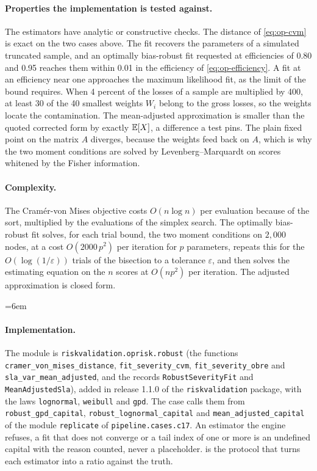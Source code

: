 \paragraph{Properties the implementation is tested against.} The estimators have analytic or constructive checks. The distance of \cref{eq:op-cvm} is exact on the two
cases above. The fit recovers the parameters of a simulated truncated sample, and an optimally bias-robust fit requested at efficiencies of 0.80 and 0.95 reaches them within
0.01 in the efficiency of \cref{eq:op-efficiency}. A fit at an efficiency near one approaches the maximum likelihood fit, as the limit of the bound requires. When 4 percent of the
losses of a sample are multiplied by 400, at least 30 of the 40 smallest weights $W_i$ belong to the gross losses, so the weights locate the contamination. The mean-adjusted
approximation is smaller than the quoted corrected form by exactly $\mathbb{E}[X]$, a difference a test pins. The plain fixed point on the matrix $A$ diverges, because the weights feed back on $A$,
which is why the two moment conditions are solved by Levenberg--Marquardt on scores whitened by the Fisher information.

\paragraph{Complexity.} The Cram\'er-von Mises objective costs $O(n\log n)$ per evaluation because of the sort, multiplied by the evaluations of the simplex search. The optimally
bias-robust fit solves, for each trial bound, the two moment conditions on $2{,}000$ nodes, at a cost $O(2000\,p^2)$ per iteration for $p$ parameters, repeats this for the
$O(\log(1/\varepsilon))$ trials of the bisection to a tolerance $\varepsilon$, and then solves the estimating equation on the $n$ scores at $O(np^2)$ per iteration.
The adjusted approximation is closed form.

\begingroup\emergencystretch=6em
\paragraph{Implementation.} The module is \texttt{riskvalidation.\allowbreak oprisk.\allowbreak robust} (the functions \texttt{cramer\_\allowbreak von\_\allowbreak mises\_\allowbreak distance},
\texttt{fit\_\allowbreak severity\_\allowbreak cvm}, \texttt{fit\_\allowbreak severity\_\allowbreak obre} and \texttt{sla\_\allowbreak var\_\allowbreak mean\_\allowbreak adjusted}, and the records
\texttt{Robust\-Severity\-Fit} and \texttt{Mean\-Adjusted\-Sla}), added in release 1.1.0
of the \texttt{riskvalidation} package, with the laws \texttt{lognormal}, \texttt{weibull} and \texttt{gpd}. The case calls them from \texttt{robust\_\allowbreak gpd\_\allowbreak capital},
\texttt{robust\_\allowbreak lognormal\_\allowbreak capital} and \texttt{mean\_\allowbreak adjusted\_\allowbreak capital} of the module \texttt{replicate} of \texttt{pipeline.\allowbreak cases.\allowbreak c17}. An estimator the engine refuses, a fit
that does not converge or a tail index of one or more is an undefined capital with the reason counted, never a placeholder.
 is the protocol that turns each estimator into a ratio against the truth.\par\endgroup

